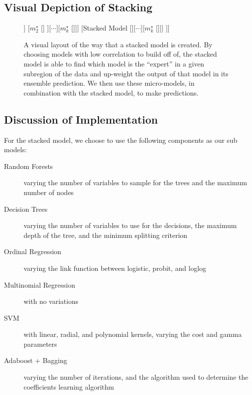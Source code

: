 \documentclass[10pt,a4paper, hidelinks]{article} %
\begin{document}
\subsection{Visual Depiction of Stacking}
\begin{figure}[H]
	\centering
	\begin{forest}
		[Final Predictions [\dattestpreds [\dattest] [$m^\star_1$ [\dattrain]] [$m^\star_2$ [\dattrain] ][$\cdots$][$m^\star_k$ [\dattrain]]] [Stacked Model [\datvaltest [\datval] [$m^\star_1$ [\dattrain]][$\cdots$][$m^\star_k$ [\dattrain]]] ]]
	\end{forest}
\caption{A visual layout of the way that a stacked model is created. By choosing models with low correlation to build off of, the stacked model is able to find which model is the ``expert'' in a given subregion of the data and up-weight the output of that model in its ensemble prediction. We then use these micro-models, in combination with the stacked model, to make predictions. }
\end{figure}



\subsection{Discussion of Implementation}
For the stacked model, we choose to use the following components as our sub models:
\begin{description}
	\item [Random Forests] varying the number of variables to sample for the trees and the maximum number of nodes
	\item [Decision Trees] varying the number of variables to use for the decisions, the maximum depth of the tree, and the minimum splitting criterion
	\item [Ordinal Regression] varying the link function between logistic, probit, and loglog
	\item [Multinomial Regression] with no variations
	\item [SVM] with linear, radial, and polynomial kernels, varying the cost and gamma parameters
	\item [Adaboost + Bagging] varying the number of iterations, and the algorithm used to determine the coefficients learning algorithm
\end{description}
\end{document}
